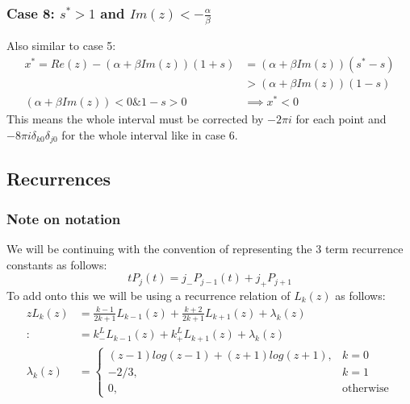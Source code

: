 \documentclass{article}
\begin{document}
\subsubsection{Case 8:  $s^*>1$ and $Im(z)<-\frac{\alpha}{\beta}$}
Also similar to case 5:
\begin{align}
    x^*=Re(z)-(\alpha+\beta Im(z))(1+s)&=(\alpha+\beta Im(z))(s^*-s)\\
    &>(\alpha+\beta Im(z))(1-s)\\
    (\alpha+\beta Im(z))<0 \& 1-s>0 &\implies x^*<0
\end{align}
This means the whole interval must be corrected by $-2\pi i$ for each point and $-8\pi i\delta_{k0}\delta_{j0}$ for the whole interval like in case 6.

\subsection{Recurrences}
\subsubsection{Note on notation}
We will be continuing with the convention of representing the 3 term recurrence constants as follows:
$$tP_j(t)=j_-P_{j-1}(t)+j_+P_{j+1}$$
To add onto this we will be using a recurrence relation of $L_k(z)$ as follows:
\begin{align}
    zL_k(z) &= \frac{k-1}{2k+1}L_{k-1}(z)+\frac{k+2}{2k+1}L_{k+1}(z)+\lambda_k(z)\\
    :&= k_-^LL_{k-1}(z)+k_+^LL_{k+1}(z)+\lambda_k(z)\\
    \lambda_k(z) &= \begin{cases}
	(z-1)log(z-1)+(z+1)log(z+1),&k=0\\
	-2/3,&k=1\\
	0,&\text{otherwise}
    \end{cases}
\end{align}
\end{document}
